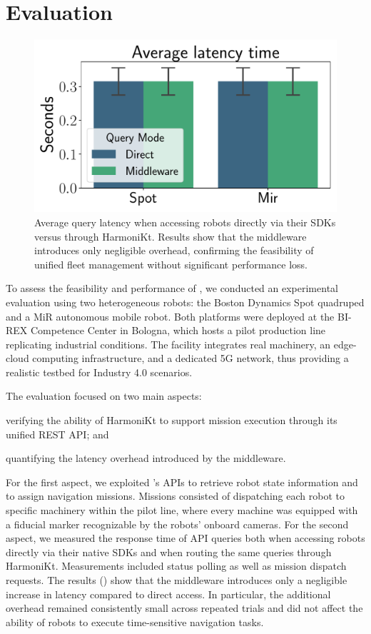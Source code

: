 \documentclass[conference]{IEEEtran}
\begin{document}
\section{Evaluation}\label{sec:eval}

\begin{figure}[htb]
    \centering
    \includegraphics[width=0.6\columnwidth]{images/latency.pdf}
    \caption{
        Average query latency when accessing robots directly via their SDKs versus through HarmoniKt. 
        Results show that the middleware introduces only negligible overhead, 
        confirming the feasibility of unified fleet management without significant performance loss.
    }
    \label{fig:latency}
\end{figure}

To assess the feasibility and performance of \approach{}, 
 we conducted an experimental evaluation using two heterogeneous robots: 
 the Boston Dynamics Spot quadruped and a MiR autonomous mobile robot. 
% 
Both platforms were deployed at the BI-REX Competence Center in Bologna, 
 which hosts a pilot production line replicating industrial conditions. 
% 
The facility integrates real machinery, an edge-cloud computing infrastructure, 
 and a dedicated 5G network, thus providing a realistic testbed for Industry 4.0 scenarios.

The evaluation focused on two main aspects: 
\begin{enumerate*}[label=(\roman*)]
    \item verifying the ability of HarmoniKt to support mission execution through its unified REST API; and 
    \item quantifying the latency overhead introduced by the middleware. 
\end{enumerate*}
% 
For the first aspect, 
 we exploited \approach{}'s APIs to retrieve robot state information and to assign navigation missions. 
% 
Missions consisted of dispatching each robot to specific machinery within the pilot line, 
 where every machine was equipped with a fiducial marker recognizable by the robots' onboard cameras. 
%
For the second aspect, 
 we measured the response time of API queries both when accessing robots directly via their native SDKs 
 and when routing the same queries through HarmoniKt. 
%  
Measurements included status polling as well as mission dispatch requests. 
%
The results () show that the middleware introduces only a negligible increase in latency compared to direct access. 
%
In particular, 
 the additional overhead remained consistently small across repeated trials 
 and did not affect the ability of robots to execute time-sensitive navigation tasks.
\end{document}
